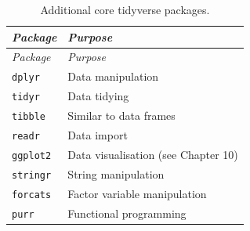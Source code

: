 \documentclass[
]{book}
\begin{document}
\begin{longtable}[]{@{}
  >{\raggedright\arraybackslash}p{}
  >{\raggedright\arraybackslash}p{}@{}}
\caption{\label{tab:TidyverseCore} Additional core tidyverse packages.}\tabularnewline
\toprule\noalign{}
\begin{minipage}[b]{\linewidth}\raggedright
\emph{{Package}}
\end{minipage} & \begin{minipage}[b]{\linewidth}\raggedright
\emph{{Purpose}}
\end{minipage} \\
\midrule\noalign{}
\endfirsthead
\toprule\noalign{}
\begin{minipage}[b]{\linewidth}\raggedright
\emph{{Package}}
\end{minipage} & \begin{minipage}[b]{\linewidth}\raggedright
\emph{{Purpose}}
\end{minipage} \\
\midrule\noalign{}
\endhead
\bottomrule\noalign{}
\endlastfoot
\texttt{dplyr} & Data manipulation \\
\texttt{tidyr} & Data tidying \\
\texttt{tibble} & Similar to data frames \\
\texttt{readr} & Data import \\
\texttt{ggplot2} & Data visualisation (see Chapter 10) \\
\texttt{stringr} & String manipulation \\
\texttt{forcats} & Factor variable manipulation \\
\texttt{purr} & Functional programming \\
\end{longtable}
\end{document}
